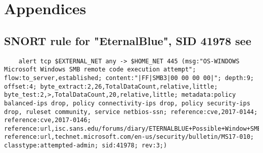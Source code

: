 \documentclass[
	letterpaper, %
	10pt, %
	unnumberedsections, %
	twoside, %
]{APAAssignment}
\begin{document}
\chapter{Appendices}
\begin{appendices}
\section{SNORT rule for "EternalBlue", SID 41978 see \cite{SnortEternalBlue}}\label{app:SnortEternalBlue}

\begin{lstlisting}
	alert tcp $EXTERNAL_NET any -> $HOME_NET 445 (msg:"OS-WINDOWS Microsoft Windows SMB remote code execution attempt"; flow:to_server,established; content:"|FF|SMB3|00 00 00 00|"; depth:9; offset:4; byte_extract:2,26,TotalDataCount,relative,little; byte_test:2,>,TotalDataCount,20,relative,little; metadata:policy balanced-ips drop, policy connectivity-ips drop, policy security-ips drop, ruleset community, service netbios-ssn; reference:cve,2017-0144; reference:cve,2017-0146; reference:url,isc.sans.edu/forums/diary/ETERNALBLUE+Possible+Window+SMB+Buffer+Overflow+0Day/22304/; reference:url,technet.microsoft.com/en-us/security/bulletin/MS17-010; classtype:attempted-admin; sid:41978; rev:3;)
\end{lstlisting}








\end{appendices}
\end{document}
